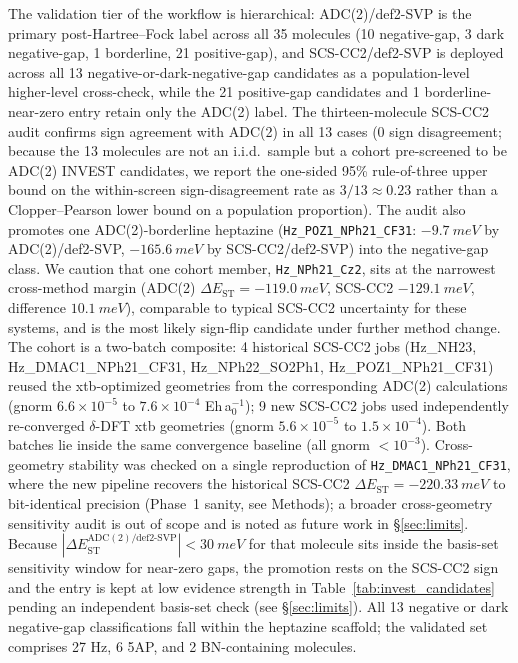\documentclass[journal=jcisd8,manuscript=article]{achemso}
\begin{document}
The validation tier of the workflow is hierarchical: ADC(2)/def2-SVP is the primary post-Hartree--Fock label across all 35 molecules (10 negative-gap, 3 dark negative-gap, 1 borderline, 21 positive-gap), and SCS-CC2/def2-SVP is deployed across all 13 negative-or-dark-negative-gap candidates as a population-level higher-level cross-check, while the 21 positive-gap candidates and 1 borderline-near-zero entry retain only the ADC(2) label. The thirteen-molecule SCS-CC2 audit confirms sign agreement with ADC(2) in all 13 cases (0 sign disagreement; because the 13 molecules are not an i.i.d.\ sample but a cohort pre-screened to be ADC(2) INVEST candidates, we report the one-sided 95\% rule-of-three upper bound on the within-screen sign-disagreement rate as $3/13 \approx 0.23$ rather than a Clopper--Pearson lower bound on a population proportion). The audit also promotes one ADC(2)-borderline heptazine (\texttt{Hz\_POZ1\_NPh21\_CF31}: $-\SI{9.7}{meV}$ by ADC(2)/def2-SVP, $-\SI{165.6}{meV}$ by SCS-CC2/def2-SVP) into the negative-gap class. We caution that one cohort member, \texttt{Hz\_NPh21\_Cz2}, sits at the narrowest cross-method margin (ADC(2) $\Delta E_\mathrm{ST}=-\SI{119.0}{meV}$, SCS-CC2 $-\SI{129.1}{meV}$, difference $\SI{10.1}{meV}$), comparable to typical SCS-CC2 uncertainty for these systems, and is the most likely sign-flip candidate under further method change. The cohort is a two-batch composite: 4 historical SCS-CC2 jobs (Hz\_NH23, Hz\_DMAC1\_NPh21\_CF31, Hz\_NPh22\_SO2Ph1, Hz\_POZ1\_NPh21\_CF31) reused the xtb-optimized geometries from the corresponding ADC(2) calculations (gnorm $6.6\!\times\!10^{-5}$ to $7.6\!\times\!10^{-4}$ Eh\,a$_0^{-1}$); 9 new SCS-CC2 jobs used independently re-converged $\delta$-DFT xtb geometries (gnorm $5.6\!\times\!10^{-5}$ to $1.5\!\times\!10^{-4}$). Both batches lie inside the same convergence baseline (all gnorm $<\!10^{-3}$). Cross-geometry stability was checked on a single reproduction of \texttt{Hz\_DMAC1\_NPh21\_CF31}, where the new pipeline recovers the historical SCS-CC2 $\Delta E_\mathrm{ST}=-\SI{220.33}{meV}$ to bit-identical precision (Phase~1 sanity, see Methods); a broader cross-geometry sensitivity audit is out of scope and is noted as future work in \S\ref{sec:limits}. Because $|\Delta E_\mathrm{ST}^\mathrm{ADC(2)/def2\text{-}SVP}| < \SI{30}{meV}$ for that molecule sits inside the basis-set sensitivity window for near-zero gaps, the promotion rests on the SCS-CC2 sign and the entry is kept at low evidence strength in Table~\ref{tab:invest_candidates} pending an independent basis-set check (see \S\ref{sec:limits}). All 13 negative or dark negative-gap classifications fall within the heptazine scaffold; the validated set comprises 27 Hz, 6 5AP, and 2 BN-containing molecules.
\end{document}
